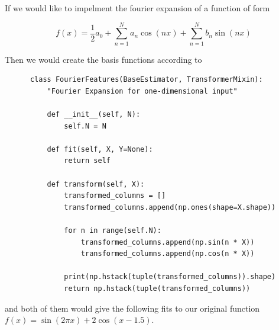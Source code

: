 \documentclass{article}
\begin{document}
      If we would like to impelment the fourier expansion of a function of form 

        \[f(x) = \frac{1}{2} a_0 + \sum_{n=1}^N a_n \cos(n x) + \sum_{n=1}^N b_n \sin(n x)\]

      Then we would create the basis functions according to 

      \begin{lstlisting}
      class FourierFeatures(BaseEstimator, TransformerMixin): 
          "Fourier Expansion for one-dimensional input"
          
          def __init__(self, N): 
              self.N = N 
              
          def fit(self, X, Y=None): 
              return self
          
          def transform(self, X): 
              transformed_columns = [] 
              transformed_columns.append(np.ones(shape=X.shape))
              
              for n in range(self.N): 
                  transformed_columns.append(np.sin(n * X))
                  transformed_columns.append(np.cos(n * X))
                  
              print(np.hstack(tuple(transformed_columns)).shape)
              return np.hstack(tuple(transformed_columns))
      \end{lstlisting} 
      and both of them would give the following fits to our original function $f(x) = \sin(2\pi x) + 2 \cos(x - 1.5)$. 
\end{document}
